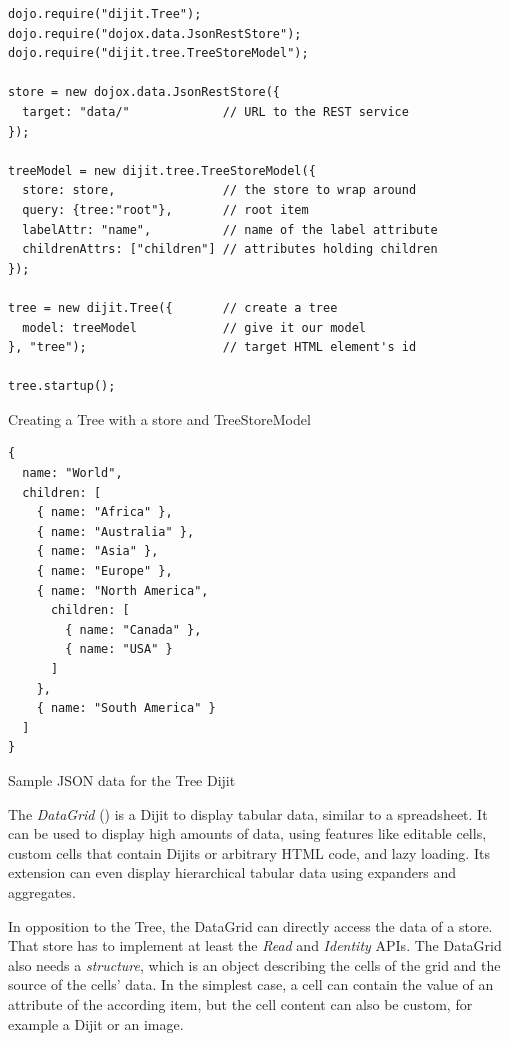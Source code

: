 \begin{listing}[H]
\begin{verbatim}
dojo.require("dijit.Tree");
dojo.require("dojox.data.JsonRestStore");
dojo.require("dijit.tree.TreeStoreModel");

store = new dojox.data.JsonRestStore({
  target: "data/"             // URL to the REST service
});

treeModel = new dijit.tree.TreeStoreModel({
  store: store,               // the store to wrap around
  query: {tree:"root"},       // root item
  labelAttr: "name",          // name of the label attribute
  childrenAttrs: ["children"] // attributes holding children
});

tree = new dijit.Tree({       // create a tree
  model: treeModel            // give it our model
}, "tree");                   // target HTML element's id

tree.startup();
\end{verbatim}
\caption{Creating a Tree with a store and TreeStoreModel}
\label{lst:tree}
\end{listing}



\begin{listing}[H]
\begin{verbatim}
{
  name: "World",
  children: [
    { name: "Africa" },
    { name: "Australia" },
    { name: "Asia" },
    { name: "Europe" },
    { name: "North America",
      children: [
        { name: "Canada" },
        { name: "USA" }
      ]
    },
    { name: "South America" }
  ]
}
\end{verbatim}
\caption{Sample JSON data for the Tree Dijit}
\label{lst:treejson}
\end{listing}

The \emph{DataGrid} () is a Dijit to display tabular data, similar to a spreadsheet. It can be used to display high amounts of data, using features like editable cells, custom cells that contain Dijits or arbitrary HTML code, and lazy loading. Its extension  can even display hierarchical tabular data using expanders and aggregates.

In opposition to the Tree, the DataGrid can directly access the data of a store. That store has to implement at least the \emph{Read} and \emph{Identity} APIs. The DataGrid also needs a \emph{structure}, which is an object describing the cells of the grid and the source of the cells' data. In the simplest case, a cell can contain the value of an attribute of the according item, but the cell content can also be custom, for example a Dijit or an image.

